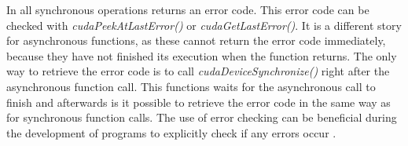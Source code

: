 In \cuda{} all synchronous operations returns an error code.
This error code can be checked with \textit{cudaPeekAtLastError()} or \textit{cudaGetLastError()}.
It is a different story for asynchronous functions, as these cannot return the error code immediately, because they have not finished its execution when the function returns.
The only way to retrieve the error code is to call \textit{cudaDeviceSynchronize()} right after the asynchronous function call.
This functions waits for the asynchronous call to finish and afterwards is it possible to retrieve the error code in the same way as for synchronous function calls.
The use of error checking can be beneficial during the development of \cuda{} programs to explicitly check if any errors occur \cite{cuda:programmingguide}. 
 